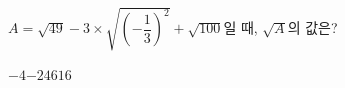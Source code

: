 $A=\sqrt{49}-3\times\sqrt{\left(-\dfrac{1}{3}\right)^2}+\sqrt{100}$일 때, $\sqrt{A}$의 값은?
\begin{choices32}{$-4$}{$-2$}{$4$}{$6$}{$16$}\end{choices32}
